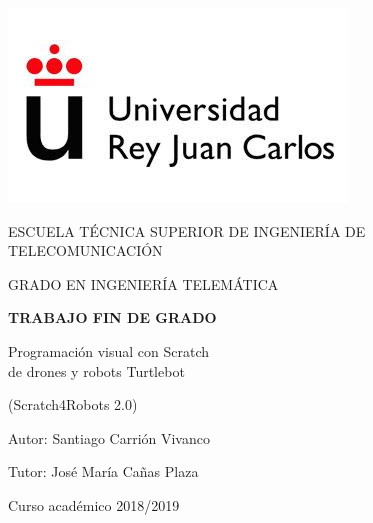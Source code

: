 \begin{titlepage}
	\begin{center}
		\vspace*{3mm}
		\begin{center}
			\includegraphics[width=0.4\linewidth]{img/urjc_logo.jpg}
		\end{center}
		\vspace{6.5mm}
		
		\fontsize{15.5}{14}\selectfont ESCUELA TÉCNICA SUPERIOR DE INGENIERÍA DE TELECOMUNICACIÓN
		\vspace{13mm}
		
		\fontsize{14}{14}\selectfont GRADO EN INGENIERÍA TELEMÁTICA
		
		\vspace{70pt}
		
		\fontsize{15.7}{14}\selectfont \textbf{TRABAJO FIN DE GRADO} 
		
		\vspace{15mm}
		\begin{huge}
			Programación visual con Scratch \\ de drones y robots Turtlebot
		\end{huge}
				\begin{huge}
							 (Scratch4Robots 2.0) 

						\end{huge}


		
		\vspace{15mm}
		
		\begin{large}
			Autor: Santiago Carrión Vivanco
			
			Tutor: José María Cañas Plaza
			
			\vspace{10mm}
		\end{large}
		\begin{normalsize}
			Curso académico 2018/2019		
		\end{normalsize}
		\vspace{10mm}
		
	\end{center}
	
\end{titlepage}
